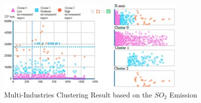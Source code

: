 
\begin{figure}
    \centering
    \includegraphics[width=0.8\textwidth]{figures/liu_assessmentOfIndustries/liu_environmentalPerformance.jpg}
    \caption{Multi-Industries Clustering Result based on the $SO_2$ Emission \cite{LIU-BDE}}
    \label{fig:multi_industries_clustering_result_environemental_performance}
\end{figure}

